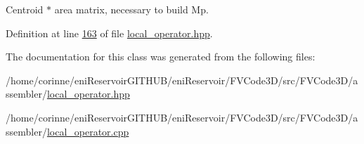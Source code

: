 Centroid $\ast$ area matrix, necessary to build Mp. 



Definition at line \hyperlink{local__operator_8hpp_source_l00163}{163} of file \hyperlink{local__operator_8hpp_source}{local\+\_\+operator.\+hpp}.



The documentation for this class was generated from the following files\+:\begin{DoxyCompactItemize}
\item 
/home/corinne/eni\+Reservoir\+G\+I\+T\+H\+U\+B/eni\+Reservoir/\+F\+V\+Code3\+D/src/\+F\+V\+Code3\+D/assembler/\hyperlink{local__operator_8hpp}{local\+\_\+operator.\+hpp}\item 
/home/corinne/eni\+Reservoir\+G\+I\+T\+H\+U\+B/eni\+Reservoir/\+F\+V\+Code3\+D/src/\+F\+V\+Code3\+D/assembler/\hyperlink{local__operator_8cpp}{local\+\_\+operator.\+cpp}\end{DoxyCompactItemize}

